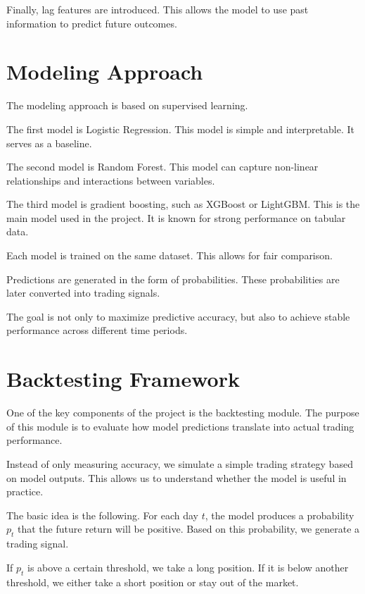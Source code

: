 \documentclass[12pt,a4paper]{article}
\begin{document}
Finally, lag features are introduced. This allows the model to use past information to predict future outcomes.

\section{Modeling Approach}

The modeling approach is based on supervised learning.

The first model is Logistic Regression. This model is simple and interpretable. It serves as a baseline.

The second model is Random Forest. This model can capture non-linear relationships and interactions between variables.

The third model is gradient boosting, such as XGBoost or LightGBM. This is the main model used in the project. It is known for strong performance on tabular data.

Each model is trained on the same dataset. This allows for fair comparison.

Predictions are generated in the form of probabilities. These probabilities are later converted into trading signals.

The goal is not only to maximize predictive accuracy, but also to achieve stable performance across different time periods.

\newpage

\section{Backtesting Framework}

One of the key components of the project is the backtesting module. The purpose of this module is to evaluate how model predictions translate into actual trading performance.

Instead of only measuring accuracy, we simulate a simple trading strategy based on model outputs. This allows us to understand whether the model is useful in practice.

The basic idea is the following. For each day $t$, the model produces a probability $p_t$ that the future return will be positive. Based on this probability, we generate a trading signal.

If $p_t$ is above a certain threshold, we take a long position. If it is below another threshold, we either take a short position or stay out of the market.
\end{document}
